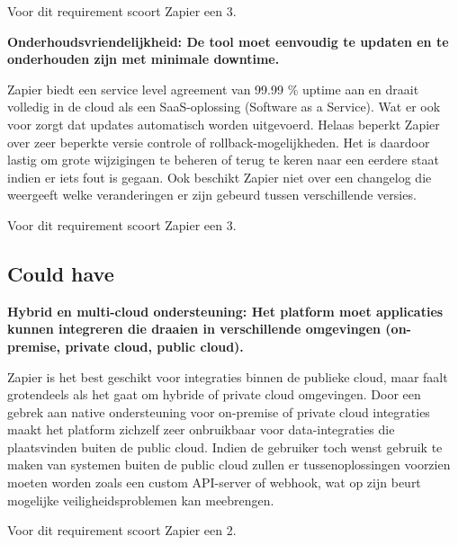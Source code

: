 Voor dit requirement scoort Zapier een 3.


\vspace{\baselineskip}

\textbf{Onderhoudsvriendelijkheid: De tool moet eenvoudig te updaten en te onderhouden zijn met minimale downtime.}

\vspace{\baselineskip}

Zapier biedt een service level agreement van 99.99 \% uptime aan en draait volledig in de cloud als een SaaS-oplossing (Software as a Service). Wat er ook voor zorgt dat updates automatisch worden uitgevoerd. Helaas beperkt Zapier over zeer beperkte versie controle of rollback-mogelijkheden. Het is daardoor lastig om grote wijzigingen te beheren of terug te keren naar een eerdere staat indien er iets fout is gegaan. Ook beschikt Zapier niet over een changelog die weergeeft welke veranderingen er zijn gebeurd tussen verschillende versies. 


Voor dit requirement scoort Zapier een 3.


\vspace{\baselineskip}

\subsection{Could have}%
\label{CouldHaveZapier}

\textbf{Hybrid en multi-cloud ondersteuning: Het platform moet applicaties kunnen integreren die draaien in verschillende omgevingen (on-premise, private cloud, public cloud).}

\vspace{\baselineskip}

Zapier is het best geschikt voor integraties binnen de publieke cloud, maar faalt grotendeels als het gaat om hybride of private cloud omgevingen. Door een gebrek aan native ondersteuning voor on-premise of private cloud integraties maakt het platform zichzelf zeer onbruikbaar voor data-integraties die plaatsvinden buiten de public cloud. Indien de gebruiker toch wenst gebruik te maken van systemen buiten de public cloud zullen er tussenoplossingen voorzien moeten worden zoals een custom API-server of webhook, wat op zijn beurt mogelijke veiligheidsproblemen kan meebrengen.


Voor dit requirement scoort Zapier een 2.


\vspace{\baselineskip}

